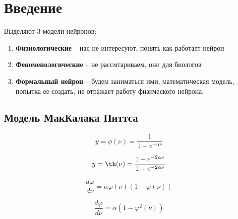 \section{Введение}

Выделяют 3 модели нейронов:

\begin{enumerate}
    \item \textbf{Физиологические} -- нас не интересуют, понять как работает нейрон
    \item \textbf{Феноменологические} -- не рассмтариваем, они для биологов
    \item \textbf{Формальный нейрон} -- будем заниматься ими, математическая модель, попытка ее создать, не отражает работу физического нейрона.
\end{enumerate}

\subsection{Модель МакКалака Питтса}

\begin{equation*}
    y = \phi(\nu) = \frac{1}{1 + e^{-\alpha \nu}}
\end{equation*}

\begin{equation*}
    y = \th(\nu) = \frac{1 - e^{-2\alpha\nu}}{1 + e^{-2\alpha\nu}}
\end{equation*}

\begin{equation*}
    \frac{d \varphi}{d \nu} = \alpha \varphi(\nu)(1 - \varphi(\nu))
\end{equation*}

\begin{equation*}
    \frac{d \varphi}{d \nu} = \alpha (1 - \varphi^2(\nu))
\end{equation*}
